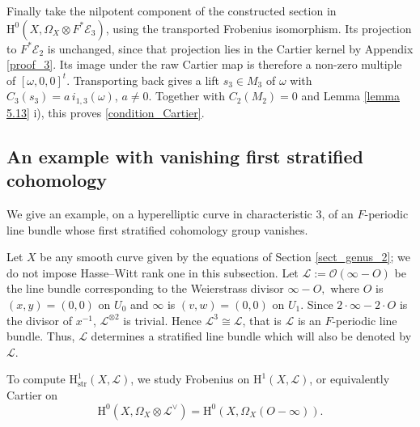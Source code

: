 \documentclass[12pt,a4]{amsart}
\theoremstyle{definition}
\begin{document}
\begin{appendix}
Finally take the nilpotent component of the constructed section in
$\mathrm H^0(X,\Omega_X\otimes F^*\mathcal E_3)$, using the transported
Frobenius isomorphism. Its projection to $F^*\mathcal E_2$ is unchanged,
since that projection lies in the Cartier kernel by Appendix \ref{proof_3}.
Its image under the raw Cartier map is therefore a non-zero multiple of
$[\omega,0,0]^t$. Transporting back gives a lift $s_3\in M_3$ of $\omega$
with $C_3(s_3)=a\,i_{1,3}(\omega)$, $a\ne0$.
Together with $C_2(M_2)=0$ and Lemma \ref{lemma 5.13} i), this proves
\eqref{condition_Cartier}.

\subsection{An example with vanishing first stratified cohomology}
\label{proof_non-example} 
We give an example, on a hyperelliptic curve in characteristic \(3\), of an
\(F\)-periodic line bundle whose first stratified cohomology group vanishes.

Let $X$ be any smooth curve given by the equations of Section \ref{sect_genus_2};
we do not impose Hasse--Witt rank one in this subsection.
Let $\mathcal{L}:=\mathcal O(\infty-O)$ 
be the line bundle corresponding to the Weierstrass divisor $\infty-O,$ 
where $O$ is $(x,y)=(0,0)$ on $U_0$ and $\infty$ is $(v,w)=(0,0)$ on $U_1$.
Since $2\cdot\infty - 2\cdot O$ is the divisor of $x^{-1}$, $\mathcal L^{\otimes 2}$ is
trivial.
Hence $\mathcal{L}^3 \cong \mathcal{L}$, that is $\mathcal{L}$ is an $F$-periodic 
line bundle. Thus, $\mathcal L$ determines a stratified line bundle
which will also be denoted by $\mathcal{L}$. 

To compute $\mathrm H^1_\mathrm{str}(X,\mathcal L)$, we study Frobenius on
$\mathrm H^1(X,\mathcal L)$, or equivalently Cartier on
\[
\mathrm{H}^0(X,\Omega_X\otimes\mathcal L^\vee)=
\mathrm{H}^0(X,\Omega_X(O - \infty)).
\]


\end{appendix}
\end{document}
